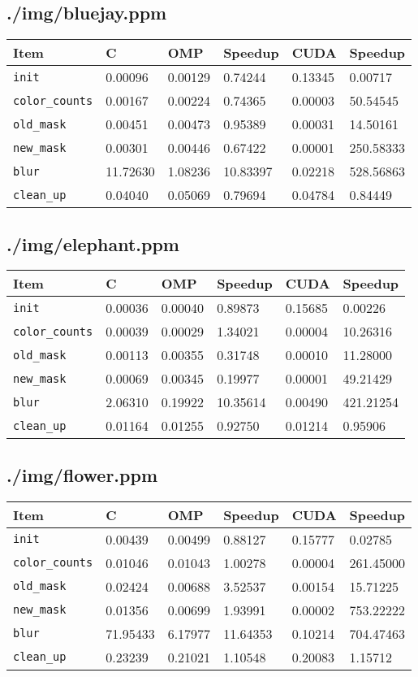 \documentclass[12pt]{article}
\begin{document}
\subsection{./img/bluejay.ppm}
\begin{tabular}{l|l|l|l|l|l}
    Item & C & OMP & Speedup & CUDA & Speedup
\\  \hline
    \texttt{init} & 0.00096 & 0.00129 & 0.74244 & 0.13345 & 0.00717
\\  \texttt{color_counts} & 0.00167 & 0.00224 & 0.74365 & 0.00003 & 50.54545
\\  \texttt{old_mask} & 0.00451 & 0.00473 & 0.95389 & 0.00031 & 14.50161
\\  \texttt{new_mask} & 0.00301 & 0.00446 & 0.67422 & 0.00001 & 250.58333
\\  \texttt{blur} & 11.72630 & 1.08236 & 10.83397 & 0.02218 & 528.56863
\\  \texttt{clean_up} & 0.04040 & 0.05069 & 0.79694 & 0.04784 & 0.84449
\end{tabular}
\subsection{./img/elephant.ppm}
\begin{tabular}{l|l|l|l|l|l}
    Item & C & OMP & Speedup & CUDA & Speedup
\\  \hline
    \texttt{init} & 0.00036 & 0.00040 & 0.89873 & 0.15685 & 0.00226
\\  \texttt{color_counts} & 0.00039 & 0.00029 & 1.34021 & 0.00004 & 10.26316
\\  \texttt{old_mask} & 0.00113 & 0.00355 & 0.31748 & 0.00010 & 11.28000
\\  \texttt{new_mask} & 0.00069 & 0.00345 & 0.19977 & 0.00001 & 49.21429
\\  \texttt{blur} & 2.06310 & 0.19922 & 10.35614 & 0.00490 & 421.21254
\\  \texttt{clean_up} & 0.01164 & 0.01255 & 0.92750 & 0.01214 & 0.95906
\end{tabular}
\subsection{./img/flower.ppm}
\begin{tabular}{l|l|l|l|l|l}
    Item & C & OMP & Speedup & CUDA & Speedup
\\  \hline
    \texttt{init} & 0.00439 & 0.00499 & 0.88127 & 0.15777 & 0.02785
\\  \texttt{color_counts} & 0.01046 & 0.01043 & 1.00278 & 0.00004 & 261.45000
\\  \texttt{old_mask} & 0.02424 & 0.00688 & 3.52537 & 0.00154 & 15.71225
\\  \texttt{new_mask} & 0.01356 & 0.00699 & 1.93991 & 0.00002 & 753.22222
\\  \texttt{blur} & 71.95433 & 6.17977 & 11.64353 & 0.10214 & 704.47463
\\  \texttt{clean_up} & 0.23239 & 0.21021 & 1.10548 & 0.20083 & 1.15712
\end{tabular}
\end{document}
